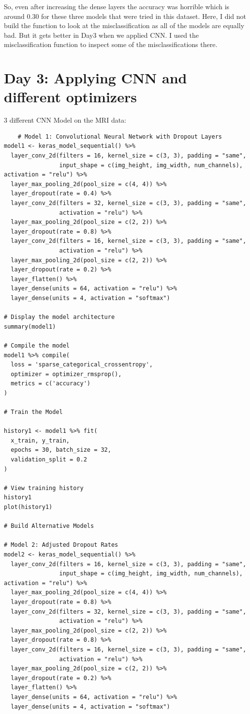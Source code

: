 \documentclass[letterpaper,11pt]{article}
\begin{document}
So, even after increasing the dense layers the accuracy was horrible which is around 0.30 for these three models that were tried in this dataset. Here, I did not build the function to look at the misclassification as all of the models are equally bad.  But it gets better in Day3 when we applied CNN. I used the misclassification function to inspect some of the misclassifications there.

\section{Day 3: Applying CNN and different optimizers}
3 different CNN Model on the MRI data:
\begin{verbatim}
    # Model 1: Convolutional Neural Network with Dropout Layers
model1 <- keras_model_sequential() %>%
  layer_conv_2d(filters = 16, kernel_size = c(3, 3), padding = "same",
                input_shape = c(img_height, img_width, num_channels), activation = "relu") %>%
  layer_max_pooling_2d(pool_size = c(4, 4)) %>%
  layer_dropout(rate = 0.4) %>%
  layer_conv_2d(filters = 32, kernel_size = c(3, 3), padding = "same",
                activation = "relu") %>%
  layer_max_pooling_2d(pool_size = c(2, 2)) %>%
  layer_dropout(rate = 0.8) %>%
  layer_conv_2d(filters = 16, kernel_size = c(3, 3), padding = "same",
                activation = "relu") %>%
  layer_max_pooling_2d(pool_size = c(2, 2)) %>%
  layer_dropout(rate = 0.2) %>%
  layer_flatten() %>%
  layer_dense(units = 64, activation = "relu") %>%
  layer_dense(units = 4, activation = "softmax")

# Display the model architecture
summary(model1)

# Compile the model
model1 %>% compile(
  loss = 'sparse_categorical_crossentropy',
  optimizer = optimizer_rmsprop(),
  metrics = c('accuracy')
)

# Train the Model

history1 <- model1 %>% fit(
  x_train, y_train,
  epochs = 30, batch_size = 32,
  validation_split = 0.2
)

# View training history
history1
plot(history1)

# Build Alternative Models

# Model 2: Adjusted Dropout Rates
model2 <- keras_model_sequential() %>%
  layer_conv_2d(filters = 16, kernel_size = c(3, 3), padding = "same",
                input_shape = c(img_height, img_width, num_channels), activation = "relu") %>%
  layer_max_pooling_2d(pool_size = c(4, 4)) %>%
  layer_dropout(rate = 0.8) %>%
  layer_conv_2d(filters = 32, kernel_size = c(3, 3), padding = "same",
                activation = "relu") %>%
  layer_max_pooling_2d(pool_size = c(2, 2)) %>%
  layer_dropout(rate = 0.8) %>%
  layer_conv_2d(filters = 16, kernel_size = c(3, 3), padding = "same",
                activation = "relu") %>%
  layer_max_pooling_2d(pool_size = c(2, 2)) %>%
  layer_dropout(rate = 0.2) %>%
  layer_flatten() %>%
  layer_dense(units = 64, activation = "relu") %>%
  layer_dense(units = 4, activation = "softmax")


\end{verbatim}
\end{document}
